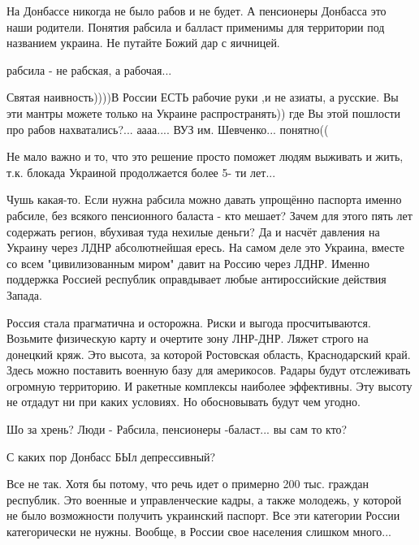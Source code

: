 \begin{itemize}
На Донбассе никогда не было рабов и не будет. А пенсионеры Донбасса это наши
родители. Понятия рабсила и балласт применимы для территории под названием
украина. Не путайте Божий дар с яичницей.

\begin{itemize} %
рабсила - не рабская, а рабочая...
\end{itemize} %


Святая наивность))))В России ЕСТЬ рабочие руки ,и не азиаты, а русские. Вы эти
мантры можете только на Украине распространять)) где Вы этой пошлости про рабов
нахватались?... аааа.... ВУЗ им. Шевченко... понятно((


Не мало важно и то, что это решение просто поможет людям выживать и жить, т.к. блокада Украиной продолжается более 5- ти лет...


Чушь какая-то. Если нужна рабсила можно давать упрощённо паспорта именно
рабсиле, без всякого пенсионного баласта - кто мешает? Зачем для этого пять лет
содержать регион, вбухивая туда нехилые деньги? Да и насчёт давления на Украину
через ЛДНР абсолютнейшая ересь. На самом деле это Украина, вместе со всем
"цивилизованным миром" давит на Россию через ЛДНР. Именно поддержка Россией
республик оправдывает любые антироссийские действия Запада.


Россия стала прагматична и осторожна. Риски и выгода просчитываются. Возьмите
физическую карту и очертите зону ЛНР-ДНР. Ляжет строго на донецкий кряж. Это
высота, за которой Ростовская область, Краснодарский край. Здесь можно
поставить военную базу для америкосов. Радары будут отслеживать огромную
территорию. И ракетные комплексы наиболее эффективны. Эту высоту не отдадут ни
при каких условиях. Но обосновывать будут чем угодно.

Шо за хрень? Люди - Рабсила, пенсионеры -баласт... вы сам то кто?

С каких пор Донбасс БЫл депрессивный?


Все не так. Хотя бы потому, что речь идет о примерно 200 тыс. граждан
республик. Это военные и управленческие кадры, а также молодежь, у которой не
было возможности получить украинский паспорт. Все эти категории России
категорически не нужны. Вообще, в России свое населения слишком много...


\end{itemize}
